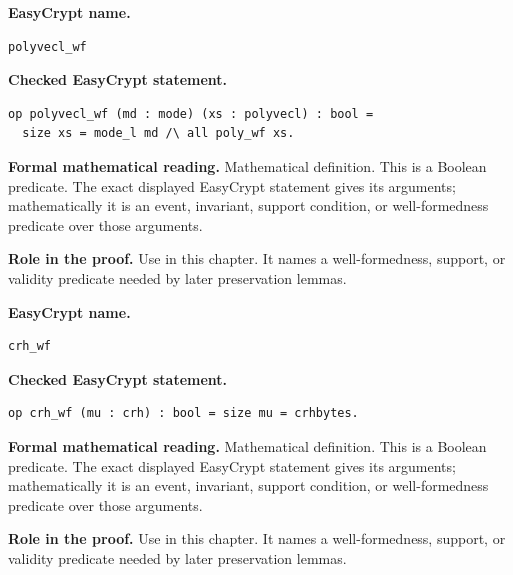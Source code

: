 \begin{formaldefinition}
\noindent\textbf{EasyCrypt name.}
\begin{lstlisting}[language=EasyCrypt,basicstyle=\ttfamily\scriptsize]
polyvecl_wf
\end{lstlisting}
\noindent\textbf{Checked EasyCrypt statement.}
\begin{lstlisting}[language=EasyCrypt,basicstyle=\ttfamily\scriptsize]
op polyvecl_wf (md : mode) (xs : polyvecl) : bool =
  size xs = mode_l md /\ all poly_wf xs.
\end{lstlisting}
\noindent\textbf{Formal mathematical reading.}
Mathematical definition. This is a Boolean predicate.  The exact displayed EasyCrypt statement gives its arguments; mathematically it is an event, invariant, support condition, or well-formedness predicate over those arguments.

\noindent\textbf{Role in the proof.}
Use in this chapter. It names a well-formedness, support, or validity predicate needed by later preservation lemmas.

\end{formaldefinition}

\begin{formaldefinition}
\noindent\textbf{EasyCrypt name.}
\begin{lstlisting}[language=EasyCrypt,basicstyle=\ttfamily\scriptsize]
crh_wf
\end{lstlisting}
\noindent\textbf{Checked EasyCrypt statement.}
\begin{lstlisting}[language=EasyCrypt,basicstyle=\ttfamily\scriptsize]
op crh_wf (mu : crh) : bool = size mu = crhbytes.
\end{lstlisting}
\noindent\textbf{Formal mathematical reading.}
Mathematical definition. This is a Boolean predicate.  The exact displayed EasyCrypt statement gives its arguments; mathematically it is an event, invariant, support condition, or well-formedness predicate over those arguments.

\noindent\textbf{Role in the proof.}
Use in this chapter. It names a well-formedness, support, or validity predicate needed by later preservation lemmas.

\end{formaldefinition}

